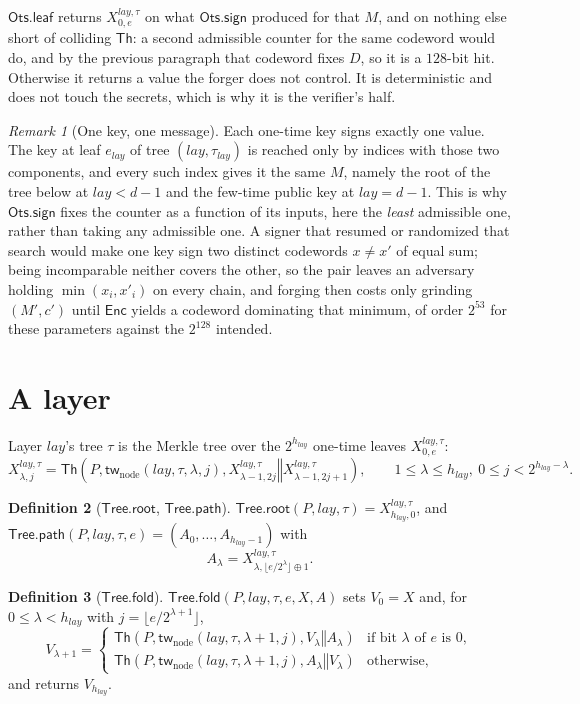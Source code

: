 \documentclass[11pt]{article}
\theoremstyle{definition}
\newtheorem{definition}{Definition}[section]
\theoremstyle{plain}
\theoremstyle{remark}
\newtheorem{remark}[definition]{Remark}
\newcommand{\Th}{\mathsf{Th}}
\newcommand{\Enc}{\mathsf{Enc}}
\newcommand{\concat}{\mathbin\Vert}
\newcommand{\lay}{\mathit{lay}}
\newcommand{\OtsSign}{\mathsf{Ots.sign}}
\newcommand{\OtsLeaf}{\mathsf{Ots.leaf}}
\newcommand{\TreeRoot}{\mathsf{Tree.root}}
\newcommand{\TreePath}{\mathsf{Tree.path}}
\newcommand{\TreeFold}{\mathsf{Tree.fold}}
\begin{document}
$\OtsLeaf$ returns $X^{\lay,\tau}_{0,e}$ on what $\OtsSign$ produced for that $M$, and on nothing else short of colliding $\Th$: a second admissible counter for the same codeword would do, and by the previous paragraph that codeword fixes $D$, so it is a $128$-bit hit. Otherwise it returns a value the forger does not control. It is deterministic and does not touch the secrets, which is why it is the verifier's half.

\begin{remark}[One key, one message]
\label{rem:once}
Each one-time key signs exactly one value. The key at leaf $e_\lay$ of tree $(\lay,\tau_\lay)$ is reached only by indices with those two components, and every such index gives it the same $M$, namely the root of the tree below at $\lay<d-1$ and the few-time public key at $\lay=d-1$. This is why $\OtsSign$ fixes the counter as a function of its inputs, here the \emph{least} admissible one, rather than taking any admissible one. A signer that resumed or randomized that search would make one key sign two distinct codewords $x\neq x'$ of equal sum; being incomparable neither covers the other, so the pair leaves an adversary holding $\min(x_i,x'_i)$ on every chain, and forging then costs only grinding $(M',c')$ until $\Enc$ yields a codeword dominating that minimum, of order $2^{53}$ for these parameters against the $2^{128}$ intended.
\end{remark}

\section{A layer}
\label{sec:layer}

Layer $\lay$'s tree $\tau$ is the Merkle tree over the $2^{h_\lay}$ one-time leaves $X^{\lay,\tau}_{0,e}$:
\[
  X^{\lay,\tau}_{\lambda,j}=\Th\!\left(P,\mathsf{tw}_{\mathrm{node}}(\lay,\tau,\lambda,j),X^{\lay,\tau}_{\lambda-1,2j}\concat X^{\lay,\tau}_{\lambda-1,2j+1}\right),
  \qquad 1\leq\lambda\leq h_\lay,\ 0\leq j<2^{h_\lay-\lambda}.
\]

\begin{definition}[$\TreeRoot$, $\TreePath$]
$\TreeRoot(P,\lay,\tau)=X^{\lay,\tau}_{h_\lay,0}$, and $\TreePath(P,\lay,\tau,e)=(A_0,\ldots,A_{h_\lay-1})$ with
\[
  A_\lambda=X^{\lay,\tau}_{\lambda,\lfloor e/2^\lambda\rfloor\oplus1}.
\]
\end{definition}

\begin{definition}[$\TreeFold$]
$\TreeFold(P,\lay,\tau,e,X,A)$ sets $V_0=X$ and, for $0\leq\lambda<h_\lay$ with $j=\lfloor e/2^{\lambda+1}\rfloor$,
\[
  V_{\lambda+1}=
  \begin{cases}
    \Th\!\left(P,\mathsf{tw}_{\mathrm{node}}(\lay,\tau,\lambda+1,j),V_\lambda\concat A_\lambda\right) & \text{if bit $\lambda$ of $e$ is }0,\\[2pt]
    \Th\!\left(P,\mathsf{tw}_{\mathrm{node}}(\lay,\tau,\lambda+1,j),A_\lambda\concat V_\lambda\right) & \text{otherwise,}
  \end{cases}
\]
and returns $V_{h_\lay}$.
\end{definition}
\end{document}
